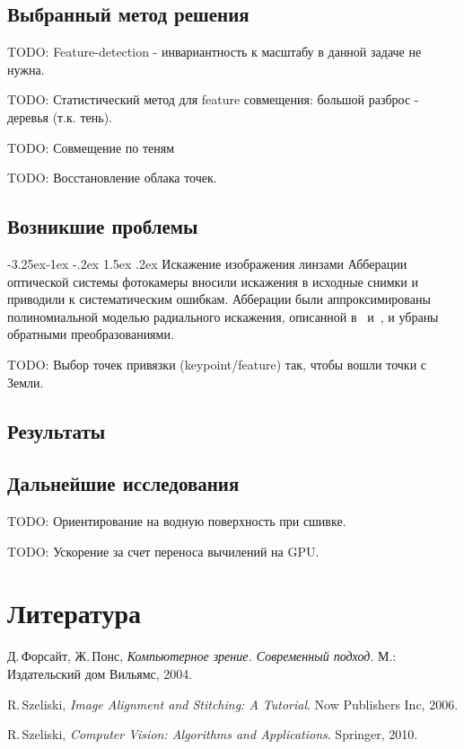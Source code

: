 \documentclass[a4paper,10pt]{article}
\makeatletter
\renewcommand\paragraph{\@startsection{paragraph}{4}{\z@}%
  {-3.25ex\@plus -1ex \@minus -.2ex}%
  {1.5ex \@plus .2ex}%
  {\normalfont\normalsize\bfseries}}
\makeatother
\begin{document}
\subsection{Выбранный метод решения}
TODO: Feature-detection - инвариантность к масштабу в данной задаче не нужна.

TODO: Статистический метод для feature совмещения: 
большой разброс - деревья (т.к. тень).

TODO: Совмещение по теням

TODO: Восстановление облака точек.

\subsection{Возникшие проблемы}
\paragraph{Искажение изображения линзами}%
Абберации оптической системы фотокамеры вносили искажения в исходные снимки 
и приводили к систематическим ошибкам.
Абберации были аппроксимированы полиномиальной моделью радиального искажения, 
описанной в~\cite{forsythponce04compvis} и~\cite{szelisky10compvis}, 
и убраны обратными преобразованиями.

TODO: Выбор точек привязки (keypoint/feature) так, чтобы вошли точки с Земли.

\subsection{Результаты}


\subsection{Дальнейшие исследования}
TODO: Ориентирование на водную поверхность при сшивке.

TODO: Ускорение за счет переноса вычилений на GPU.

\section{Литература}

\begin{thebibliography}{9}

  Д.\,Форсайт, Ж.\,Понс,
  \emph{Компьютерное зрение. Современный подход}.
  М.: Издательский дом {\guillemotleft}Вильямс{\guillemotright},
  2004.

  R.\,Szeliski,
  \emph{Image Alignment and Stitching: A Tutorial}.
  Now Publishers Inc,
  2006.

  R.\,Szeliski,
  \emph{Computer Vision: Algorithms and Applications}.
  Springer,
  2010.

\end{thebibliography}
\end{document}

